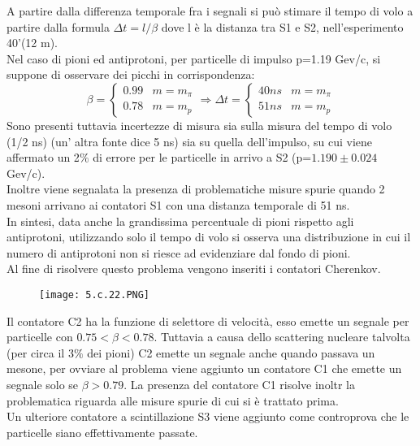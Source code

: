 \documentclass[twoside]{article}
\begin{document}
A partire dalla differenza temporale fra i segnali si può stimare il tempo di volo a partire dalla formula $\Delta t= l/\beta$ dove l è la distanza tra S1 e S2, nell'esperimento 40'(12 m).\\
Nel caso di pioni ed antiprotoni, per particelle di impulso p=1.19 Gev/c, si suppone di osservare dei picchi in corrispondenza:\\
\begin{equation}
    \beta=\begin{cases}
    0.99 &  m=m_{\pi} \\
    0.78 &  m=m_{p}
    \end{cases}\Longrightarrow
    \Delta t=  \begin{cases}
    40 ns &  m=m_{\pi} \\
    51 ns &  m=m_{p}
    \end{cases}
\end{equation}
Sono presenti tuttavia incertezze di misura sia sulla misura del tempo di volo (1/2 ns) (un' altra fonte dice 5 ns) sia su quella dell'impulso, su cui viene affermato un 2$\%$ di errore per le particelle in arrivo a S2 (p=$1.190 \pm 0.024$ Gev/c).\\
Inoltre viene segnalata la presenza di problematiche misure spurie quando 2 mesoni arrivano ai contatori S1 con una distanza temporale di 51 ns.\\
In sintesi, data anche la grandissima percentuale di pioni rispetto agli antiprotoni, utilizzando solo il tempo di volo si osserva una distribuzione in cui il numero di antiprotoni non si riesce ad evidenziare dal fondo di pioni.\\ Al fine di risolvere questo problema vengono inseriti i contatori Cherenkov.\\
\begin{figure}[H]
    \centering
    \texttt{[image: 5.c.22.PNG]}
    \label{fig:5.c.22}
\end{figure}
Il contatore C2 ha la funzione di selettore di velocità, esso emette un segnale per particelle con $0.75<\beta<0.78$. Tuttavia a causa dello scattering nucleare talvolta (per circa il 3$\%$ dei pioni) C2 emette un segnale anche quando passava un mesone, per ovviare al problema viene aggiunto un contatore C1 che emette un segnale solo se $\beta>0.79$. La presenza del contatore C1 risolve inoltr la problematica riguarda alle misure spurie di cui si è trattato prima.\\
Un ulteriore contatore a scintillazione S3 viene aggiunto come controprova che le particelle siano effettivamente passate.\\
\end{document}
